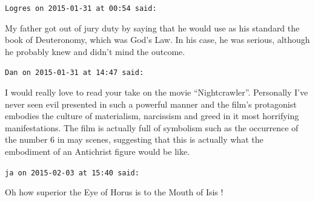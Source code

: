\begin{footnotesize}
\begin{sffamily}
\hfill

\texttt{Logres on 2015-01-31 at 00:54 said:}

My father got out of jury duty by saying that he would use as his standard the book of Deuteronomy, which was God's Law. In his case, he was serious, although he probably knew and didn't mind the outcome.

\hfill

\texttt{Dan on 2015-01-31 at 14:47 said:}

I would really love to read your take on the movie ``Nightcrawler''. Personally I've never seen evil presented in such a powerful manner and the film's protagonist embodies the culture of materialism, narcissism and greed in it most horrifying manifestations. The film is actually full of symbolism such as the occurrence of the number 6 in may scenes, suggesting that this is actually what the embodiment of an Antichrist figure would be like.

\hfill

\texttt{ja on 2015-02-03 at 15:40 said:}

Oh how superior the Eye of Horus is to the Mouth of Isis !

\end{sffamily}
\end{footnotesize}

